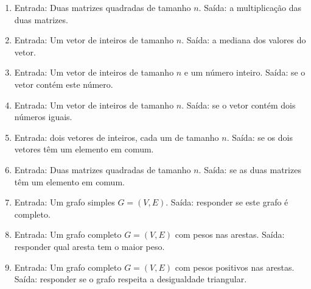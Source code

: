 \documentclass[12pt]{article}
\begin{document}
\begin{enumerate}
\begin{enumerate}
\item Entrada: Duas matrizes quadradas de tamanho $n$. Saída: a multiplicação das duas matrizes.

\item Entrada: Um vetor de inteiros de tamanho $n$. Saída: a mediana dos valores do vetor.

\item Entrada: Um vetor de inteiros de tamanho $n$ e um número inteiro. Saída: se o vetor contém este número.

\item Entrada: Um vetor de inteiros de tamanho $n$. Saída: se o vetor contém dois números iguais.

\item Entrada: dois vetores de inteiros, cada um de tamanho $n$. Saída: se os dois vetores têm um elemento em comum.

\item Entrada: Duas matrizes quadradas de tamanho $n$. Saída: se as duas matrizes têm um elemento em comum.

\item Entrada: Um grafo simples $G=(V, E)$. Saída: responder se este grafo é completo.

\item Entrada: Um grafo completo $G=(V, E)$ com pesos nas arestas. Saída: responder qual aresta tem o maior peso.

\item Entrada: Um grafo completo $G=(V, E)$ com pesos positivos nas arestas. Saída: responder se o grafo respeita a desigualdade triangular.



\end{enumerate}



\end{enumerate}
\end{document}
